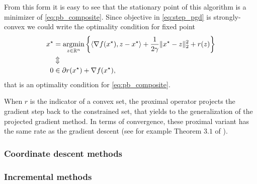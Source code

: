 From this form it is easy to see that the stationary point of this algorithm is a minimizer of \eqref{eq:pb_composite}. Since objective in \eqref{eq:step_pgd} is strongly-convex we could write the optimality condition for fixed point
\begin{align*}
x^\star &= \operatorname*{argmin}_{z\in\mathbb{R}^n}\left\{\langle\nabla f(x^\star), z-x^\star\rangle+\frac{1}{2\gamma}\|x^\star-z\|_2^2 + r(z)\right\}\\
&\Updownarrow\\
0&\in \partial r(x^\star) + \nabla f(x^\star),
\end{align*}
that is an optimality condition for \eqref{eq:pb_composite}.

When $r$ is the indicator of a convex set, the proximal operator projects the gradient step back to the constrained set, that yields to the generalization of the projected gradient method. In terms of convergence, these proximal variant has the same rate as the gradient descent (see for example Theorem $3.1$ of \cite{beck2009fast}).

\subsubsection{Coordinate descent methods}


\subsubsection{Incremental methods}
